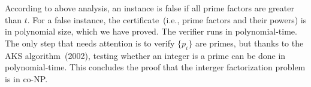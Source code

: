 According to above analysis, an instance is false if all prime factors are greater than $t$. 
For a false instance, the certificate~(i.e., prime factors and their powers) is in polynomial size, which we have proved.
The verifier runs in polynomial-time. The only step that needs
attention is to verify $\{p_i\}$ are primes,
but thanks to the AKS algorithm~(2002), testing whether an integer is a prime can be done in polynomial-time.
This concludes the proof that the interger factorization problem is in co-NP.
